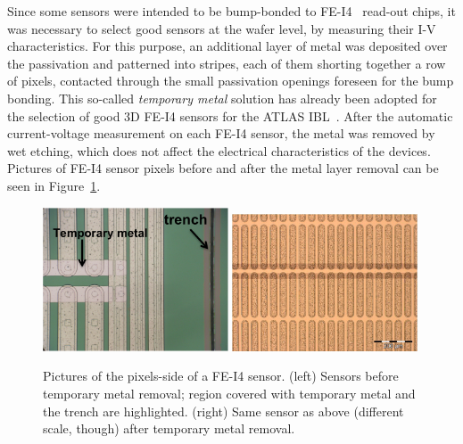 Since some sensors were intended to  be bump-bonded to  FE-I4~\cite{FEI4} read-out chips, 
it was necessary to select good sensors at the wafer level, by measuring their I-V characteristics.
 For this purpose, an additional layer of metal was deposited over the passivation and patterned into stripes, each of them shorting together a row of pixels, contacted through
 the small passivation openings foreseen for the bump bonding.
This so-called {\it temporary metal} solution has already been adopted for the selection of good 3D FE-I4 sensors for the ATLAS IBL~\cite{bib:metal}.
After the automatic current-voltage  measurement
 on each FE-I4 sensor, the metal was removed by  wet etching, which does not affect the electrical characteristics  of the devices.
Pictures of FE-I4 sensor pixels before and after the metal layer removal can be seen in Figure~\ref{fig:tempmetal}.

\begin{figure}[!htpb]
\centering
\includegraphics[width=0.49\textwidth]{annotated_temporarymetal.png}
\includegraphics[width=0.49\textwidth]{notemporarymetal-izm.png}
\caption{Pictures of the pixels-side of a FE-I4 sensor. (left) Sensors before temporary metal removal; region covered with temporary metal and the trench are highlighted. (right)
Same sensor as above (different scale, though)  after temporary metal removal.}
\label{fig:tempmetal}
\end{figure}

